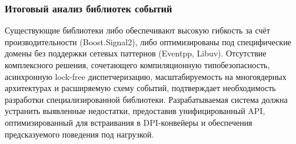 \subsubsection{Итоговый анализ библиотек событий}
Существующие библиотеки либо обеспечивают высокую гибкость за счёт производительности (Boost.Signal2), либо оптимизированы под специфические домены без поддержки сетевых паттернов (Eventpp, Libuv). Отсутствие комплексного решения, сочетающего компиляционную типобезопасность, асинхронную lock-free диспетчеризацию, масштабируемость на многоядерных архитектурах и расширяемую схему событий, подтверждает необходимость разработки специализированной библиотеки. Разрабатываемая система должна устранить выявленные недостатки, предоставив унифицированный API, оптимизированный для встраивания в DPI-конвейеры и обеспечения предсказуемого поведения под нагрузкой.

\newpage